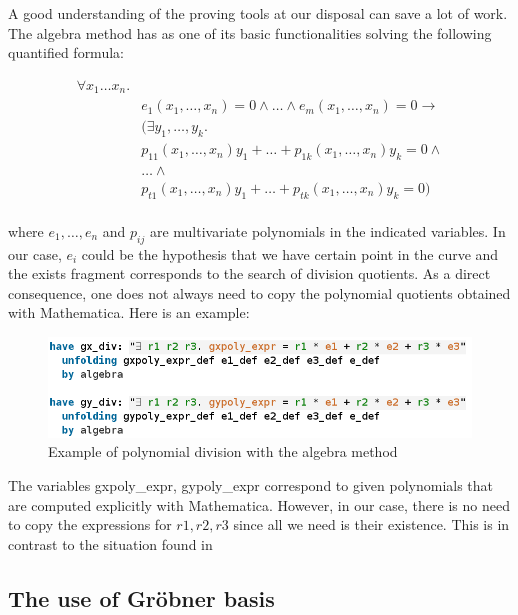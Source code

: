A good understanding of the proving tools at our disposal can save a lot of work. The algebra method \cite{wenzel2019isabelle} has as one of its basic functionalities solving the following quantified formula: 

\begin{align*}
\forall x_1 \ldots x_n. &  \\        
& e_1(x_1,\ldots,x_n) = 0 \land \ldots \land e_m(x_1,\ldots,x_n) = 0 \to \\
& (\exists y_1, \ldots, y_k. \\
& p_{11}(x_1,\ldots,x_n) y_1 + \ldots + p_{1k}(x_1,\ldots,x_n) y_k = 0 \land \\
& \ldots \land \\
& p_{t1}(x_1,\ldots,x_n) y_1 + \ldots + p_{tk}(x_1,\ldots,x_n) y_k = 0) \\
&
\end{align*}

where $e_1,\ldots,e_n$ and $p_{ij}$ are multivariate polynomials in the indicated variables. In our case, $e_i$ could be the hypothesis that we have certain point in the curve and the exists fragment corresponds to the search of division quotients. As a direct consequence, one does not always need to copy the polynomial quotients obtained with Mathematica. Here is an example:

\begin{figure}[!htbp]
	\centering
	\includegraphics[width=0.8\linewidth,height=0.8\textheight,keepaspectratio]{img/poly_expr.png}
	\caption{Example of polynomial division with the algebra method}
	\label{fig:groebner}
\end{figure}

The variables gxpoly\_expr, gypoly\_expr correspond to given polynomials that are computed explicitly with Mathematica. However, in our case, there is no need to copy the expressions for $r1,r2,r3$ since all we need is their existence. This is in contrast to the situation found in \cite{hales2016group}

\subsection{The use of Gröbner basis}

